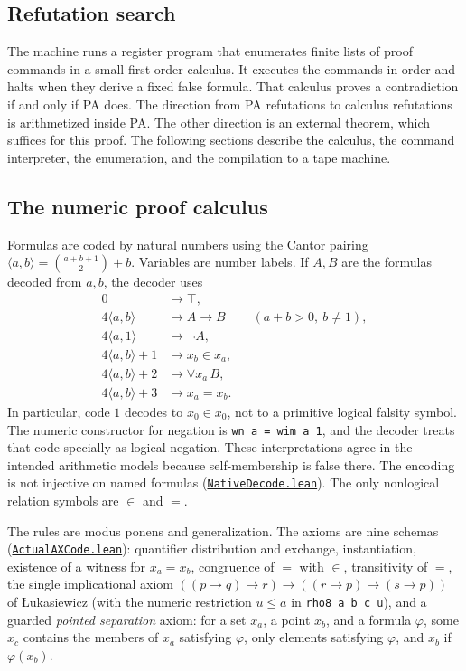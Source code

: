 \documentclass[11pt,letterpaper]{article}
\newcommand{\src}[2]{\href{https://github.com/jamesyc/BusyBeaver/blob/034d08df73b94e9f4036fc5af74b694eb73afc67/#1}{\texttt{\nolinkurl{#2}}}}
\begin{document}
\subsection{Refutation search}

The machine runs a register program that enumerates finite lists of proof
commands in a small first-order calculus. It executes the commands in
order and halts when they derive a fixed false formula. That calculus
proves a contradiction if and only if PA does. The direction from PA
refutations to calculus refutations is arithmetized inside PA. The other
direction is an external theorem, which suffices for this proof. The
following sections describe the calculus, the command interpreter, the
enumeration, and the compilation to a tape machine.

\subsection{The numeric proof calculus}

Formulas are coded by natural numbers using the Cantor pairing
$\langle a,b\rangle=\binom{a+b+1}{2}+b$. Variables are number labels.
If $A,B$ are the formulas decoded from $a,b$, the decoder uses
\[
\begin{aligned}
0 &\mapsto \top,\\
4\langle a,b\rangle &\mapsto A\to B &&(a+b>0,\ b\ne1),\\
4\langle a,1\rangle &\mapsto \neg A,\\
4\langle a,b\rangle+1 &\mapsto x_b\in x_a,\\
4\langle a,b\rangle+2 &\mapsto \forall x_a\,B,\\
4\langle a,b\rangle+3 &\mapsto x_a=x_b.
\end{aligned}
\]
In particular, code $1$ decodes to $x_0\in x_0$, not to a primitive
logical falsity symbol. The numeric constructor for negation is
\texttt{wn a = wim a 1}, and the decoder treats that code specially as
logical negation. These interpretations agree in the intended arithmetic
models because self-membership is false there. The encoding is not
injective on named formulas
(\src{Lean/metamathematics/PA215PA/NativeDecode.lean}{NativeDecode.lean}).
The only nonlogical relation symbols are $\in$ and $=$.

The rules are modus ponens and generalization. The axioms are nine
schemas (\src{Lean/PA215/Source/ActualAXCode.lean}{ActualAXCode.lean}):
quantifier distribution and exchange, instantiation, existence of a
witness for $x_a=x_b$, congruence of $=$ with $\in$, transitivity of $=$,
the single implicational axiom
$((p\to q)\to r)\to((r\to p)\to(s\to p))$ of {\L}ukasiewicz (with the
numeric restriction $u\le a$ in \texttt{rho8 a b c u}), and a guarded
\emph{pointed separation} axiom: for a
set $x_a$, a point $x_b$, and a formula $\varphi$, some $x_c$ contains the
members of $x_a$ satisfying $\varphi$, only elements satisfying $\varphi$,
and $x_b$ if $\varphi(x_b)$.
\end{document}
